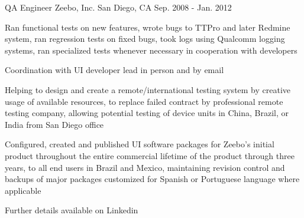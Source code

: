 \begin{cventries}
\cventry
{QA Engineer} %
{Zeebo, Inc.} %
{San Diego, CA} %
{Sep. 2008 - Jan. 2012} %
{
\begin{cvitems}
\item {Ran functional tests on new features, wrote bugs to TTPro and later Redmine system, ran regression tests on fixed bugs, took logs using Qualcomm logging systems, ran specialized tests whenever necessary in cooperation with developers}
\item {Coordination with UI developer lead in person and by email}
\item {Helping to design and create a remote/international testing system by creative usage of available resources, to replace failed contract by professional remote testing company, allowing potential testing of device units in China, Brazil, or India from San Diego office}
\item {Configured, created and published UI software packages for Zeebo's initial product throughout the entire commercial lifetime of the product through three years, to all end users in Brazil and Mexico, maintaining revision control and backups of major packages customized for Spanish or Portuguese language where applicable}
\end{cvitems}
}

\cventry
{} %
{Further details available on Linkedin} %
{} %
{} %
{
\begin{cvitems}
\end{cvitems}
}

\end{cventries}
